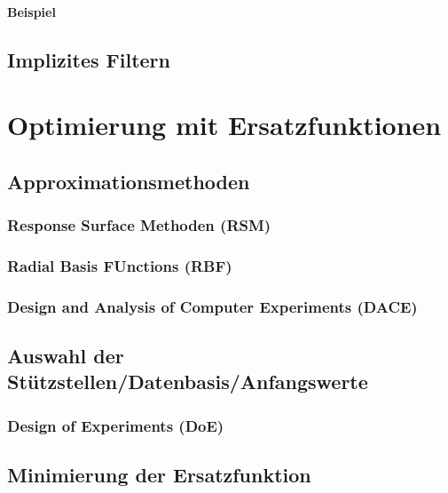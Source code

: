 			\paragraph{Beispiel} %

		\subsection{Implizites Filtern} %

	\section{Optimierung mit Ersatzfunktionen} %

		\subsection{Approximationsmethoden} %

			\subsubsection{Response Surface Methoden (RSM)} %

			\subsubsection{Radial Basis FUnctions (RBF)} %

			\subsubsection{Design and Analysis of Computer Experiments (DACE)} %

		\subsection{Auswahl der Stützstellen/Datenbasis/Anfangswerte} %

			\subsubsection{Design of Experiments (DoE)} %

		\subsection{Minimierung der Ersatzfunktion} %

